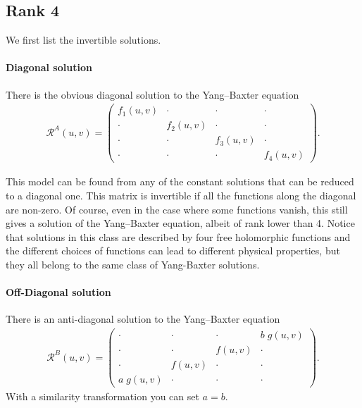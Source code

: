 \documentclass{article}
\begin{document}
\subsection{Rank 4}

We first  list the invertible solutions.

\paragraph{Diagonal solution}
There is the obvious diagonal solution to the Yang--Baxter equation
%
\begin{align}
    \mathcal{R}^{A}(u,v)=\begin{pmatrix}
        f_1(u,v) &\cdot&\cdot&\cdot\\
        \cdot&f_2(u,v)&\cdot&\cdot\\
        \cdot&\cdot&f_3(u,v)&\cdot\\
        \cdot&\cdot&\cdot&f_4(u,v)
    \end{pmatrix}.
\end{align}
%

This model can be found from any of the constant solutions that can be reduced to a diagonal one. This matrix is invertible if all the functions along the diagonal are non-zero. Of course, even in the case where some functions vanish, this still gives a solution of the Yang--Baxter equation, albeit of rank lower than 4. Notice that solutions in this class are described by four free holomorphic functions and the different choices of functions can lead to different physical properties, but they all belong to the same class of Yang-Baxter solutions.

%
\paragraph{Off-Diagonal solution}
There is an anti-diagonal solution to the Yang--Baxter equation
%
\begin{align}
    \mathcal{R}^{B}(u,v)=\begin{pmatrix}
       \cdot&\cdot&\cdot& b\; g(u,v) \\
        \cdot&\cdot&f(u,v)&\cdot\\
        \cdot&f(u,v)&\cdot&\cdot\\
       a\; g(u,v)&\cdot&\cdot&\cdot
    \end{pmatrix}.
\end{align}
%
With a similarity transformation you can set $a=b$.
\end{document}
